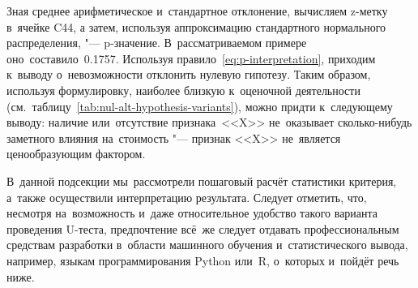 \documentclass[]{scrartcl}
\begin{document}
Зная среднее арифметическое и~стандартное отклонение, вычисляем z-метку в~ячейке C44, а затем, используя аппроксимацию стандартного нормального распределения, "--- p-значение. В~рассматриваемом примере оно~составило~0.1757. Используя правило~\ref{eq:p-interpretation}, приходим к~выводу о~невозможности отклонить нулевую гипотезу. Таким образом, используя формулировку, наиболее близкую к~оценочной деятельности (см.~таблицу~\ref{tab:nul-alt-hypothesis-variants}), можно придти к~следующему выводу: наличие или~отсутствие признака~<<X>> не~оказывает сколько-нибудь заметного влияния на~стоимость "--- признак <<X>> не~является ценообразующим фактором.

В~данной подсекции мы~рассмотрели пошаговый расчёт статистики критерия, а~также осуществили интерпретацию результата. Следует отметить, что, несмотря на~возможность и~даже относительное удобство такого варианта проведения U-теста, предпочтение всё~же следует отдавать профессиональным средствам разработки в~области машинного обучения и~статистического вывода, например, языкам программирования Python или~R, о~которых и~пойдёт речь ниже.

\clearpage
\end{document}
